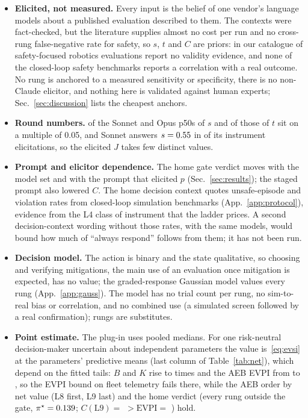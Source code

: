 \documentclass{article}
\newcommand{\evpi}{\mathrm{EVPI}}
\newcommand{\pist}{\pi^\star}
\begin{document}
\begin{itemize}
\item \textbf{Elicited, not measured.} Every input is the belief of one vendor's language models about a published evaluation described to them. The contexts were fact-checked, but the literature supplies almost no cost per run and no cross-rung false-negative rate for safety, so $s$, $t$ and $C$ are priors: in our catalogue \twNNoValidity{} of \twNRobotSafety{} safety-focused robotics evaluations report no validity evidence, and none of the \twNLevelFour{} closed-loop safety benchmarks reports a correlation with a real outcome. No rung is anchored to a measured sensitivity or specificity, there is no non-Claude elicitor, and nothing here is validated against human experts; Sec.~\ref{sec:discussion} lists the cheapest anchors.
\item \textbf{Round numbers.} \twRoundS{} of the Sonnet and Opus p50s of $s$ and \twRoundT{} of those of $t$ sit on a multiple of 0.05, and Sonnet answers $s=0.55$ in \twRoundModeSN{} of its \twRoundModeSOf{} instrument elicitations, so the elicited $J$ takes few distinct values.
\item \textbf{Prompt and elicitor dependence.} The home gate verdict moves with the model set and with the prompt that elicited $p$ (Sec.~\ref{sec:results}); the staged prompt also lowered $C$. The home decision context quotes unsafe-episode and violation rates from closed-loop simulation benchmarks (App.~\ref{app:protocol}), evidence from the L4 class of instrument that the ladder prices. A second decision-context wording without those rates, with the same models, would bound how much of ``always respond'' follows from them; it has not been run.
\item \textbf{Decision model.} The action is binary and the state qualitative, so choosing and verifying mitigations, the main use of an evaluation once mitigation is expected, has no value; the graded-response Gaussian model values every rung (App.~\ref{app:gauss}). The model has no trial count per rung, no sim-to-real bias or correlation, and no combined use (a simulated screen followed by a real confirmation); rungs are substitutes.
\item \textbf{Point estimate.} The plug-in uses pooled medians. For one risk-neutral decision-maker uncertain about independent parameters the value is~\eqref{eq:evsi} at the parameters' predictive means (last column of Table~\ref{tab:net}), which depend on the fitted tails: $B$ and $K$ rise \twMeanRatioLo{} to \twMeanRatioHi{} times and the AEB EVPI from \twAebEVPI{} to \twAebEVPIMean, so the EVPI bound on fleet telemetry fails there, while the AEB order by net value (L8 first, L9 last) and the home verdict (every rung outside the gate, $\pist=\twHomePiStarMean$; $C(\mathrm{L9})=$ \twHomeCLNineMean{} $>\evpi=$ \twHomeEVPIMean) hold.

\end{itemize}
\end{document}
